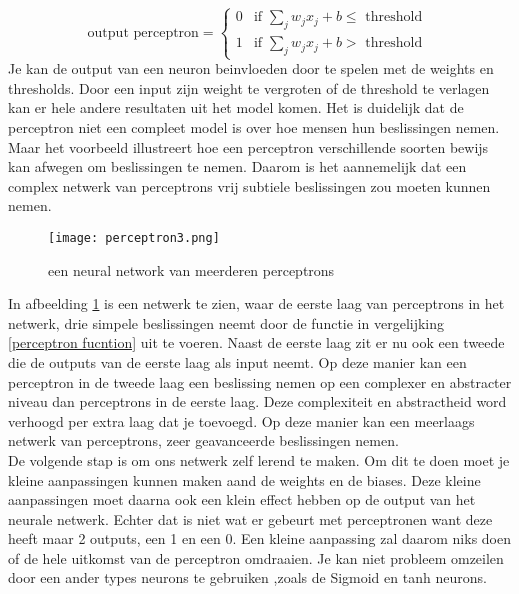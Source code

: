 \begin{equation*}
\text{output perceptron}= \begin{cases}
0 &\text{if $\sum_{j}w_{j}x_{j}+ b \leq $ threshold }\\
1 &\text{if $\sum_{j}w_{j}x_{j}+ b>$ threshold }
\end{cases} 
\label{perceptron functie}
\end{equation*}
\newline
\noindent Je kan de output van een neuron beinvloeden door te spelen met de weights en thresholds. Door een input zijn weight te vergroten of de threshold te verlagen kan er hele andere resultaten uit het model komen\cite{NeuralNetwork1}. 
\newpage
\noindent Het is duidelijk dat de perceptron niet een compleet model is over hoe mensen hun beslissingen nemen. Maar het voorbeeld illustreert hoe een perceptron verschillende soorten bewijs kan afwegen om beslissingen te nemen. Daarom is het aannemelijk dat een complex netwerk van perceptrons vrij subtiele beslissingen zou moeten kunnen nemen\cite{NeuralNetwork1}.
\begin{figure}[h!]
\centering
\texttt{[image: perceptron3.png]}
\caption{een neural network van meerderen perceptrons}
\label{perceptron3}
\end{figure}
\newline
In afbeelding \ref{perceptron3} is een netwerk te zien, waar de eerste laag van perceptrons in het netwerk, drie simpele beslissingen neemt door de functie in vergelijking \ref{perceptron fucntion} uit te voeren. Naast de eerste laag zit er nu ook een tweede die de outputs van de eerste laag als input neemt. Op deze manier kan een perceptron in de tweede laag een beslissing nemen op een complexer en abstracter niveau dan perceptrons in de eerste laag. Deze complexiteit en abstractheid word verhoogd per extra laag dat je toevoegd. Op deze manier kan een meerlaags netwerk van perceptrons, zeer geavanceerde beslissingen nemen\cite{NeuralNetwork1}\cite{learning}.\\ 
\newline
De volgende stap is om ons netwerk zelf lerend te maken. Om dit te doen moet je kleine aanpassingen kunnen maken aand de weights en de biases. Deze kleine aanpassingen moet daarna ook een klein effect hebben op de output van het neurale netwerk. Echter dat is niet wat er gebeurt met perceptronen want deze heeft maar 2 outputs, een 1 en een 0. Een kleine aanpassing zal daarom niks doen of de hele uitkomst van de perceptron omdraaien. Je kan niet probleem omzeilen door een ander types neurons te gebruiken ,zoals de Sigmoid en tanh neurons.\cite{learning}
\pagebreak
